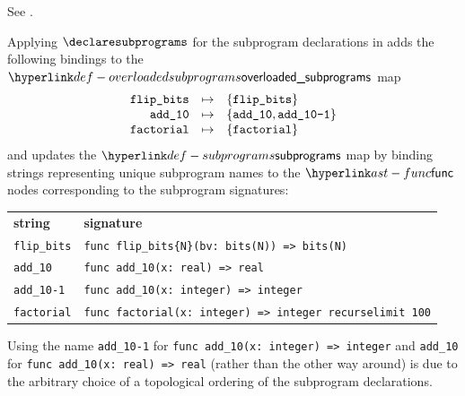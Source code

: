 
See .


Applying $\declaresubprograms$ for the subprogram declarations in 
adds the following bindings to the $\overloadedsubprograms$ map
\[
\begin{array}{rcl}
  \texttt{flip\_bits} &\mapsto& \{\texttt{flip\_bits}\} \\
  \texttt{add\_10}    &\mapsto& \{\texttt{add\_10}, \texttt{add\_10-1}\} \\
  \texttt{factorial}  &\mapsto& \{\texttt{factorial}\} \\
\end{array}
\]
and updates the $\subprograms$ map by binding
strings representing unique subprogram names to the $\func$ nodes corresponding to
the subprogram signatures:
\begin{center}
\begin{tabular}{ll}
\textbf{string}     & \textbf{signature}\\
\texttt{flip\_bits} & \verb|func flip_bits{N}(bv: bits(N)) => bits(N)|\\
\texttt{add\_10}    & \verb|func add_10(x: real) => real|\\
\texttt{add\_10-1}  & \verb|func add_10(x: integer) => integer|\\
\texttt{factorial}  & \verb|func factorial(x: integer) => integer recurselimit 100|
\end{tabular}
\end{center}

Using the name \texttt{add\_10-1} for \verb|func add_10(x: integer) => integer|
and \texttt{add\_10} for \verb|func add_10(x: real) => real| (rather than
the other way around) is due to the arbitrary choice of a topological ordering
of the subprogram declarations.




